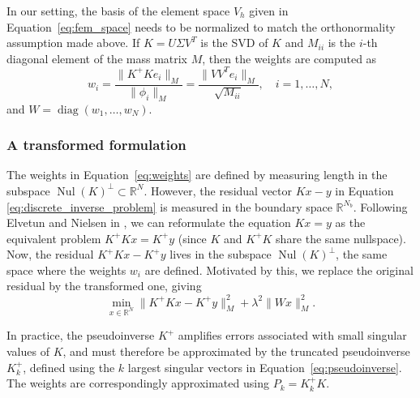 In our setting, the basis of the element space $V_h$ given in Equation~\eqref{eq:fem_space} needs to be normalized to match the orthonormality assumption made above. If $K = U\Sigma V^T$ is the SVD of $K$ and $M_{ii}$ is the $i$-th diagonal element of the mass matrix $M$, then the weights are computed as 
\begin{equation}\label{eq:weights}
    w_i =
    \frac{\| K^+ K e_i \|_M}
         {\| \phi_i \|_M} =
    \frac{\| V V^T e_i \|_M}
         {\sqrt{M_{ii}}},
    \quad i = 1, \dots, N,
\end{equation}
and $W = \operatorname{diag}(w_1, \dots, w_N)$.


\subsubsection{A transformed formulation}
The weights in Equation~\eqref{eq:weights} are defined by measuring length in the subspace $\operatorname{Nul}(K)^\perp \subset \mathbb{R}^N$. However, the residual vector $K x - y$ in Equation \eqref{eq:discrete_inverse_problem} is measured in the boundary space $\mathbb{R}^{N_b}$. Following Elvetun and Nielsen in \cite{elvetunWeightedSparsityRegularization2023}, we can reformulate the equation $K x = y$ as the equivalent problem $K^+ K x = K^+ y$ (since $K$ and $K^+K$ share the same nullspace). Now, the residual $K^+ K x - K^+ y$ lives in the subspace $\operatorname{Nul}(K)^\perp$, the same space where the weights $w_i$ are defined. Motivated by this, we replace the original residual by the transformed one, giving
\begin{equation}\label{eq:transformed_discrete_inverse_problem}
    \min_{x \in \mathbb{R}^N}
    \| K^+ K x - K^+ y \|_{M}^2
    + \lambda^2 \| W x \|_M^2.
\end{equation}

In practice, the pseudoinverse $K^+$ amplifies errors associated with small singular values of $K$, and must therefore be approximated by the truncated pseudoinverse $K_k^+$, defined using the $k$ largest singular vectors in Equation~\eqref{eq:pseudoinverse}. The weights are correspondingly approximated using $P_k = K_k^+ K$.
